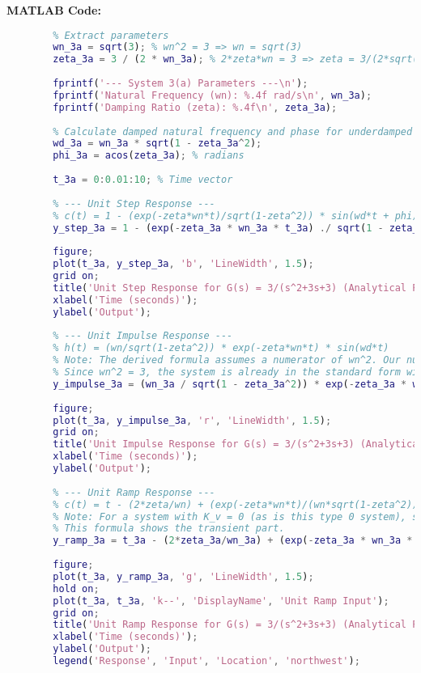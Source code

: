 \documentclass{article}
\begin{document}
	\textbf{MATLAB Code:}
	\begin{lstlisting}[language=Matlab, caption=MATLAB Code for Problem 3(a) (Using Formulas)]
		% System: C(s)/R(s) = 3/(s^2+3s+3)
		% Extract parameters
		wn_3a = sqrt(3); % wn^2 = 3 => wn = sqrt(3)
		zeta_3a = 3 / (2 * wn_3a); % 2*zeta*wn = 3 => zeta = 3/(2*sqrt(3)) = sqrt(3)/2
		
		fprintf('--- System 3(a) Parameters ---\n');
		fprintf('Natural Frequency (wn): %.4f rad/s\n', wn_3a);
		fprintf('Damping Ratio (zeta): %.4f\n', zeta_3a);
		
		% Calculate damped natural frequency and phase for underdamped case
		wd_3a = wn_3a * sqrt(1 - zeta_3a^2);
		phi_3a = acos(zeta_3a); % radians
		
		t_3a = 0:0.01:10; % Time vector
		
		% --- Unit Step Response ---
		% c(t) = 1 - (exp(-zeta*wn*t)/sqrt(1-zeta^2)) * sin(wd*t + phi)
		y_step_3a = 1 - (exp(-zeta_3a * wn_3a * t_3a) ./ sqrt(1 - zeta_3a^2)) .* sin(wd_3a * t_3a + phi_3a);
		
		figure;
		plot(t_3a, y_step_3a, 'b', 'LineWidth', 1.5);
		grid on;
		title('Unit Step Response for G(s) = 3/(s^2+3s+3) (Analytical Plot)');
		xlabel('Time (seconds)');
		ylabel('Output');
		
		% --- Unit Impulse Response ---
		% h(t) = (wn/sqrt(1-zeta^2)) * exp(-zeta*wn*t) * sin(wd*t)
		% Note: The derived formula assumes a numerator of wn^2. Our numerator is 3.
		% Since wn^2 = 3, the system is already in the standard form with implicit K=1.
		y_impulse_3a = (wn_3a / sqrt(1 - zeta_3a^2)) * exp(-zeta_3a * wn_3a * t_3a) .* sin(wd_3a * t_3a);
		
		figure;
		plot(t_3a, y_impulse_3a, 'r', 'LineWidth', 1.5);
		grid on;
		title('Unit Impulse Response for G(s) = 3/(s^2+3s+3) (Analytical Plot)');
		xlabel('Time (seconds)');
		ylabel('Output');
		
		% --- Unit Ramp Response ---
		% c(t) = t - (2*zeta/wn) + (exp(-zeta*wn*t)/(wn*sqrt(1-zeta^2))) * sin(wd*t + 2*phi)
		% Note: For a system with K_v = 0 (as is this type 0 system), steady state error to ramp is infinite.
		% This formula shows the transient part.
		y_ramp_3a = t_3a - (2*zeta_3a/wn_3a) + (exp(-zeta_3a * wn_3a * t_3a) ./ (wn_3a * sqrt(1 - zeta_3a^2))) .* sin(wd_3a * t_3a + 2*phi_3a);
		
		figure;
		plot(t_3a, y_ramp_3a, 'g', 'LineWidth', 1.5);
		hold on;
		plot(t_3a, t_3a, 'k--', 'DisplayName', 'Unit Ramp Input');
		grid on;
		title('Unit Ramp Response for G(s) = 3/(s^2+3s+3) (Analytical Plot)');
		xlabel('Time (seconds)');
		ylabel('Output');
		legend('Response', 'Input', 'Location', 'northwest');
		

\end{lstlisting}
\end{document}
